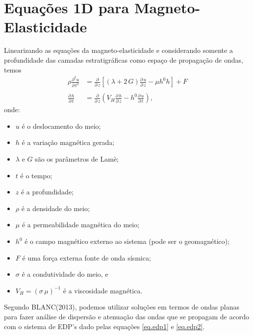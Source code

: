 \chapter{Equa\c{c}\~oes 1D para Magneto-Elasticidade}
Linearizando as equa\c{c}\~oes da magneto-elasticidade e considerando somente a profundidade das camadas estratigr\'aficas como espa\c{c}o de propaga\c{c}\~ao de ondas, temos
\begin{align}\label{eq.edp1}
\rho\frac{\partial^2u}{\partial\,t^2}&=\frac{\partial}{\partial\,z}\left[(\lambda+2\,G)\frac{\partial\,u}{\partial\,z}-\mu h^0h\right]+F\\\nonumber\\\label{eq.edp2}
\frac{\partial\,h}{\partial\,t}&=\frac{\partial}{\partial\,z}\left(V_H\frac{\partial\,h}{\partial\,z}-h^0\frac{\partial\,u}{\partial\,t}\right),
\end{align}
onde:
\begin{itemize}
\item $u$ \'e o deslocamento do meio;
\item $h$ \'e a varia\c{c}\~ao magn\'etica gerada;
\item $\lambda$ e $G$ s\~ao os par\^ametros de Lam\`e;
\item $t$ \'e o tempo;
\item $z$ \'e a profundidade;
\item $\rho$ \'e a densidade do meio;
\item $\mu$ \'e a permeabilidade magn\'etica do meio;
\item $h^0$ \'e o campo magn\'etico externo ao sistema (pode ser o geomagn\'etico);
\item $F$ \'e uma for\c{c}a externa fonte de onda s\'ismica;
\item $\sigma$ \'e a condutividade do meio, e
\item $V_H=(\sigma\,\mu)^{-1}$ \'e a viscosidade magn\'etica.
\end{itemize}

Segundo BLANC(2013), podemos utilizar solu\c{c}\~oes em termos de ondas planas para fazer an\'alise de dispers\~ao e atenua\c{c}\~ao das ondas que se propagam de acordo com o sistema de EDP's dado pelas equa\c{c}\~oes \ref{eq.edp1} e \ref{eq.edp2}.

